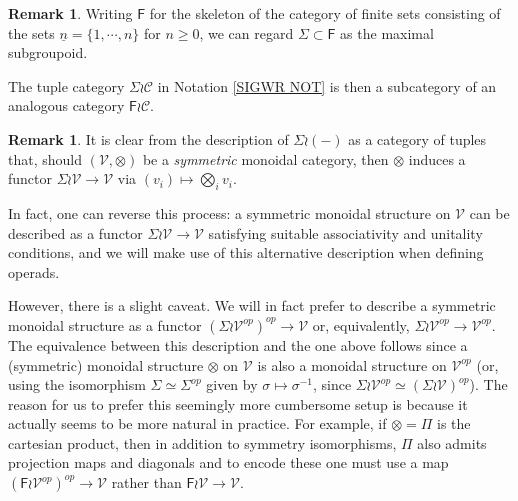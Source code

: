 \documentclass[a4paper,10pt
,draft
]{article}%
\numberwithin{equation}{section}
\numberwithin{figure}{section}
\theoremstyle{definition} %
\newtheorem{remark}[equation]{Remark}%
\newcommand{\V}{\ensuremath{\mathcal V}}
\newcommand{\1}{\ensuremath{\mathbbm 1}}%
\begin{document}
\begin{remark}\label{FWR REM}
Writing $\mathsf{F}$ for the skeleton of 
the category of finite sets consisting of the sets 
$\underline{n} = \{1,\cdots,n\}$ for $n \geq 0$,
we can regard
$\Sigma \subset \mathsf{F}$
as the maximal subgroupoid.

The tuple category $\Sigma \wr \mathcal{C}$
in Notation \ref{SIGWR NOT}
is then a subcategory of an analogous category
$\mathsf{F} \wr \mathcal{C}$.
\end{remark}



\begin{remark}
It is clear from the description
of $\Sigma \wr (-)$
as a category of tuples that, 
should $(\V,\otimes)$ be a \emph{symmetric} monoidal category,
then $\otimes$
induces a functor
$\Sigma \wr \V \to \mathcal{V}$
via $(v_i) \mapsto \bigotimes_i v_i$.

In fact, one can reverse this process: a symmetric monoidal structure on $\V$ can be described as a functor
$\Sigma \wr \V \to \V$
satisfying suitable associativity and unitality conditions, and we will make use of this alternative description when defining operads.

However, there is a slight caveat. 
We will in fact prefer to describe a symmetric monoidal structure
as a functor
$\left(\Sigma \wr \V^{op}\right)^{op} \to \V$
or, equivalently, 
$\Sigma \wr \V^{op} \to \V^{op}$.
The equivalence between this description and the one above
follows since a (symmetric) monoidal structure $\otimes$ on $\V$ is also a monoidal structure on $\V^{op}$
(or, using the isomorphism
$\Sigma \simeq \Sigma^{op}$ given by $\sigma \mapsto \sigma^{-1}$,
since $\Sigma \wr \V^{op} \simeq \left(\Sigma \wr \V \right)^{op}$).
The reason for us to prefer this seemingly more cumbersome setup is because it actually seems to be more natural in practice.
For example, if $\otimes = \Pi$ is the cartesian product, 
then in addition to symmetry isomorphisms, 
$\Pi$ also admits projection maps and diagonals and to encode these one must use a map
$\left(\mathsf{F} \wr \mathcal{V}^{op}\right)^{op} \to \mathcal{V}$
rather than
$\mathsf{F} \wr \mathcal{V} \to \mathcal{V}$.
\end{remark}
\end{document}
